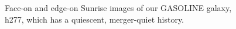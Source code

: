 \documentclass[manuscript]{aastex}
\begin{document}
\begin{figure}
\centerline{}
\caption[]{Face-on and edge-on Sunrise images of our GASOLINE galaxy, h277, which has a quiescent, merger-quiet history.}
\label{h277face} 
\end{figure}
\end{document}
